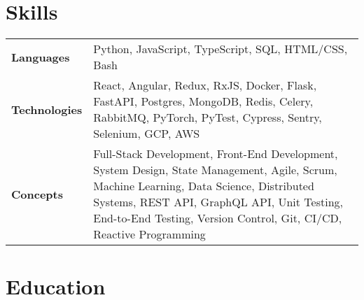\documentclass{ethan_cv}
\begin{document}
\section{Skills}
    \small
     \begin{tabular}{p{2.25cm} p{16cm}}
         \textbf{Languages} & Python, JavaScript, TypeScript, SQL, HTML/CSS, Bash \\ 
         \textbf{Technologies} & React, Angular, Redux, RxJS, Docker, Flask, FastAPI, Postgres, MongoDB, Redis, Celery, RabbitMQ, PyTorch, PyTest, Cypress, Sentry, Selenium, GCP, AWS \\
         \textbf{Concepts} & Full-Stack Development, Front-End Development, System Design, State Management, Agile, Scrum, Machine Learning, Data Science, Distributed Systems, REST API, GraphQL API, Unit Testing, End-to-End Testing, Version Control, Git, CI/CD, Reactive Programming
     \end{tabular}
     \vspace{+3mm}


\section{Education}
\end{document}
